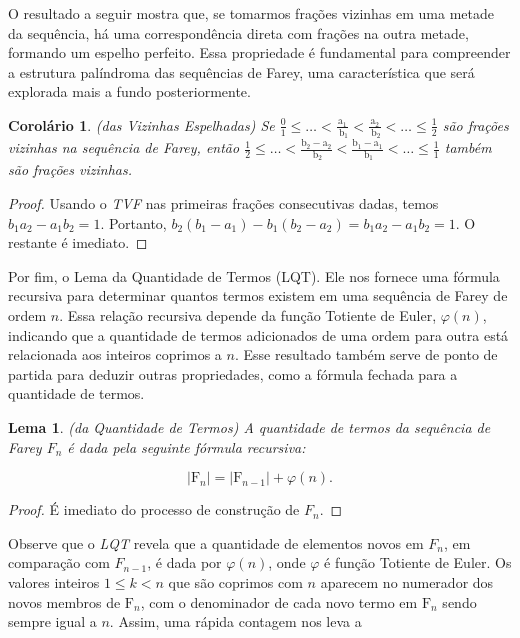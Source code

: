 \documentclass{hipatia}
\newtheorem*{lemma*}{Lema}
\newtheorem*{corollary*}{Corolário} %
\theoremstyle{definition} %
\begin{document}
O resultado a seguir mostra que, se tomarmos frações vizinhas em uma metade da sequência, há uma correspondência direta com frações na outra metade, formando um espelho perfeito. Essa propriedade é fundamental para compreender a estrutura palíndroma das sequências de Farey, uma característica que será explorada mais a fundo posteriormente.

\begin{corollary*} (das Vizinhas Espelhadas)
    Se \(\frac{0}{1} \leq \ldots<\frac{\mathrm{a}_{1}}{\mathrm{~b}_{1}}<\frac{\mathrm{a}_{2}}{\mathrm{~b}_{2}}<\ldots \leq \frac{1}{2}\) são frações vizinhas na sequência de Farey, então \(\frac{1}{2} \leq \ldots<\frac{\mathrm{b}_{2}-\mathrm{a}_{2}}{\mathrm{~b}_{2}}<\frac{\mathrm{b}_{1}-\mathrm{a}_{1}}{\mathrm{~b}_{1}}<\ldots \leq \frac{1}{1}\) também são frações vizinhas.
\end{corollary*}



\begin{proof}
Usando o \textit{TVF} nas primeiras frações consecutivas dadas, temos  
\(b_{1} a_{2} - a_{1} b_{2} = 1\).  
Portanto, \(b_{2}\left(b_{1} - a_{1}\right) - b_{1}\left(b_{2} - a_{2}\right) = b_{1} a_{2} - a_{1} b_{2} = 1\). O restante é imediato.
\end{proof}

Por fim, o Lema da Quantidade de Termos (LQT). Ele nos fornece uma fórmula recursiva para determinar quantos termos existem em uma sequência de Farey de ordem $n$. Essa relação recursiva depende da função Totiente de Euler, $\varphi(n)$, indicando que a quantidade de termos adicionados de uma ordem para outra está relacionada aos inteiros coprimos a $n$. Esse resultado também serve de ponto de partida para deduzir outras propriedades, como a fórmula fechada para a quantidade de termos.

\begin{lemma*} (da Quantidade de Termos)
    A quantidade de termos da sequência de Farey \(F_{n}\) é dada pela seguinte fórmula recursiva:

\[
\left|\mathrm{F}_{n}\right|=\left|\mathrm{F}_{n-1}\right|+\varphi(n) .
\]
\end{lemma*}

\begin{proof}
    É imediato do processo de construção de $F_n$.
\end{proof}

Observe que o \textit{LQT} revela que a quantidade de elementos novos em \(F_{n}\), em comparação com \(F_{n-1}\), é dada por \(\varphi(n)\), onde $\varphi$ é função Totiente de Euler. Os valores inteiros \(1 \leq k < n\) que são coprimos com \(n\) aparecem no numerador dos novos membros de \(\mathrm{F}_{n}\), com o denominador de cada novo termo em \(\mathrm{F}_{n}\) sendo sempre igual a \(n\). Assim, uma rápida contagem nos leva a
\end{document}
